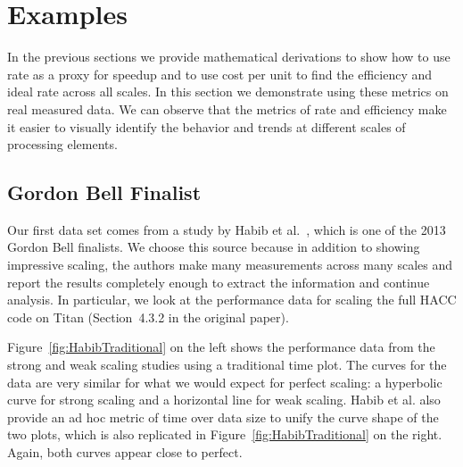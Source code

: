 \documentclass{llncs}
\newcommand*{\scite}[1]{~\cite{#1}}
\newcommand{\etal}{et al.\xspace}
\begin{document}



\section{Examples}

\noindent
In the previous sections we provide mathematical derivations to show how
to use rate as a proxy for speedup and to use cost per unit to find the
efficiency and ideal rate across all scales. In this section we demonstrate
using these metrics on real measured data. We can observe that the metrics
of rate and efficiency make it easier to visually identify the behavior and
trends at different scales of processing elements.

\subsection{Gordon Bell Finalist}

\noindent
Our first data set comes from a study by Habib \etal\scite{Habib2013}, which is
one of the 2013 Gordon Bell finalists. We choose this source because in
addition to showing impressive scaling, the authors make many measurements
across many scales and report the results completely enough to extract the
information and continue analysis. In particular, we look at the
performance data for scaling the full HACC code on Titan (Section~4.3.2 in
the original paper).

Figure~\ref{fig:HabibTraditional} on the left shows the performance data
from the strong and weak scaling studies using a traditional time plot. The
curves for the data are very similar for what we would expect for perfect
scaling: a hyperbolic curve for strong scaling and a horizontal line for
weak scaling. Habib \etal also provide an ad hoc metric of time over data
size to unify the curve shape of the two plots, which is also replicated in
Figure~\ref{fig:HabibTraditional} on the right. Again, both curves appear
close to perfect.
\end{document}
